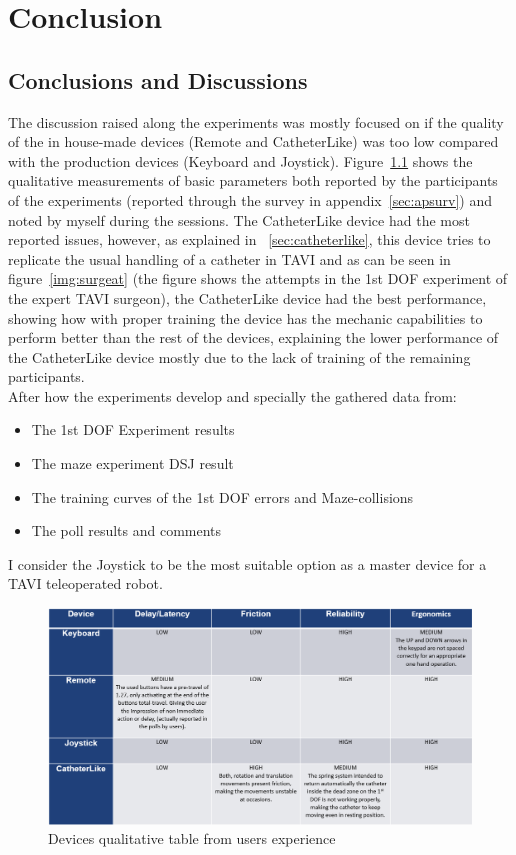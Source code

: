 
\chapter{Conclusion}\label{chap:conclusion}


\section{Conclusions and Discussions} \label{conclusiondiscussion}
The discussion raised along the experiments was mostly focused on if the quality of the in house-made devices (Remote and CatheterLike) was too low compared with the production devices (Keyboard and Joystick). Figure~\ref{img:devcomp} shows the qualitative measurements of basic parameters both reported by the participants of the experiments (reported through the survey in appendix~\ref{sec:apsurv}) and noted by myself during the sessions. The CatheterLike device had the most reported issues, however, as explained in ~\ref{sec:catheterlike}, this device tries to replicate the usual handling of a catheter in TAVI and as can be seen in figure~\ref{img:surgeat} (the figure shows the attempts in the 1st DOF experiment of the expert TAVI surgeon), the CatheterLike device had the best performance, showing how with proper training the device has the mechanic capabilities to perform better than the rest of the devices, explaining the lower performance of the CatheterLike device mostly due to the lack of training of the remaining participants.\\

After how the experiments develop and specially the gathered data from:
\begin{itemize}
 \item The 1st DOF Experiment results
 \item The maze experiment DSJ result
 \item The training curves of the 1st DOF errors and Maze-collisions
 \item The poll results and comments
\end{itemize}

I consider the Joystick to be the most suitable option as a master device for a TAVI teleoperated robot.\\


\begin{figure}[ht]
   \centering
   \includegraphics[width=1.0\textwidth]{img/devcomp.PNG}
   \caption{Devices qualitative table from users experience}
   \label{img:devcomp}
\end{figure}


